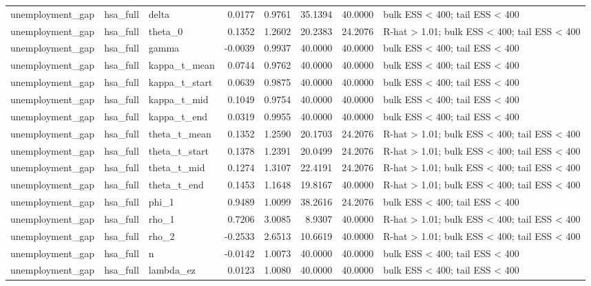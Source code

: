 \begin{tabular}{lllrrrrl}
unemployment\_gap & hsa\_full & delta & 0.0177 & 0.9761 & 35.1394 & 40.0000 & bulk ESS < 400; tail ESS < 400 \\
unemployment\_gap & hsa\_full & theta\_0 & 0.1352 & 1.2602 & 20.2383 & 24.2076 & R-hat > 1.01; bulk ESS < 400; tail ESS < 400 \\
unemployment\_gap & hsa\_full & gamma & -0.0039 & 0.9937 & 40.0000 & 40.0000 & bulk ESS < 400; tail ESS < 400 \\
unemployment\_gap & hsa\_full & kappa\_t\_mean & 0.0744 & 0.9762 & 40.0000 & 40.0000 & bulk ESS < 400; tail ESS < 400 \\
unemployment\_gap & hsa\_full & kappa\_t\_start & 0.0639 & 0.9875 & 40.0000 & 40.0000 & bulk ESS < 400; tail ESS < 400 \\
unemployment\_gap & hsa\_full & kappa\_t\_mid & 0.1049 & 0.9754 & 40.0000 & 40.0000 & bulk ESS < 400; tail ESS < 400 \\
unemployment\_gap & hsa\_full & kappa\_t\_end & 0.0319 & 0.9955 & 40.0000 & 40.0000 & bulk ESS < 400; tail ESS < 400 \\
unemployment\_gap & hsa\_full & theta\_t\_mean & 0.1352 & 1.2590 & 20.1703 & 24.2076 & R-hat > 1.01; bulk ESS < 400; tail ESS < 400 \\
unemployment\_gap & hsa\_full & theta\_t\_start & 0.1378 & 1.2391 & 20.0499 & 24.2076 & R-hat > 1.01; bulk ESS < 400; tail ESS < 400 \\
unemployment\_gap & hsa\_full & theta\_t\_mid & 0.1274 & 1.3107 & 22.4191 & 24.2076 & R-hat > 1.01; bulk ESS < 400; tail ESS < 400 \\
unemployment\_gap & hsa\_full & theta\_t\_end & 0.1453 & 1.1648 & 19.8167 & 40.0000 & R-hat > 1.01; bulk ESS < 400; tail ESS < 400 \\
unemployment\_gap & hsa\_full & phi\_1 & 0.9489 & 1.0099 & 38.2616 & 24.2076 & bulk ESS < 400; tail ESS < 400 \\
unemployment\_gap & hsa\_full & rho\_1 & 0.7206 & 3.0085 & 8.9307 & 40.0000 & R-hat > 1.01; bulk ESS < 400; tail ESS < 400 \\
unemployment\_gap & hsa\_full & rho\_2 & -0.2533 & 2.6513 & 10.6619 & 40.0000 & R-hat > 1.01; bulk ESS < 400; tail ESS < 400 \\
unemployment\_gap & hsa\_full & n & -0.0142 & 1.0073 & 40.0000 & 40.0000 & bulk ESS < 400; tail ESS < 400 \\
unemployment\_gap & hsa\_full & lambda\_ez & 0.0123 & 1.0080 & 40.0000 & 40.0000 & bulk ESS < 400; tail ESS < 400 \\

\end{tabular}
